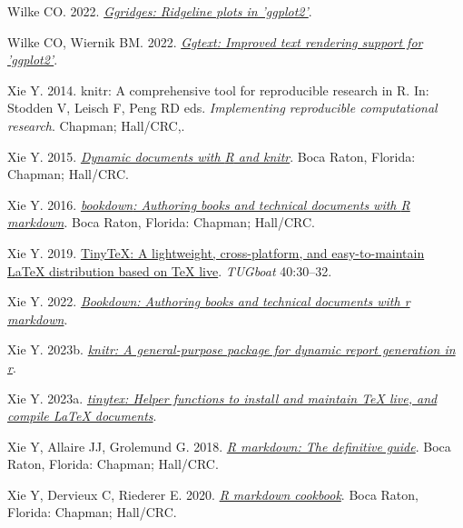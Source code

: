 \documentclass[10pt,a4paper]{article}
\newlength{\cslhangindent}
\newenvironment{CSLReferences}[2] %
 {\begin{list}{}{%
  \setlength{\itemindent}{0pt}
  \setlength{\leftmargin}{0pt}
  \setlength{\parsep}{0pt}
  \ifodd #1
   \setlength{\leftmargin}{\cslhangindent}
   \setlength{\itemindent}{-1\cslhangindent}
  \fi
  \setlength{\itemsep}{#2\baselineskip}}}
 {\end{list}}
\begin{document}
\begin{CSLReferences}{1}{0}
Wilke CO. 2022. \emph{\href{https://CRAN.R-project.org/package=ggridges}{Ggridges: Ridgeline plots in 'ggplot2'}}.

Wilke CO, Wiernik BM. 2022. \emph{\href{https://CRAN.R-project.org/package=ggtext}{Ggtext: Improved text rendering support for 'ggplot2'}}.

Xie Y. 2014. {knitr}: A comprehensive tool for reproducible research in {R}. In: Stodden V, Leisch F, Peng RD eds. \emph{Implementing reproducible computational research}. Chapman; Hall/CRC,.

Xie Y. 2015. \emph{\href{https://yihui.org/knitr/}{Dynamic documents with {R} and knitr}}. Boca Raton, Florida: Chapman; Hall/CRC.

Xie Y. 2016. \emph{\href{https://bookdown.org/yihui/bookdown}{{bookdown}: Authoring books and technical documents with {R} markdown}}. Boca Raton, Florida: Chapman; Hall/CRC.

Xie Y. 2019. \href{https://tug.org/TUGboat/Contents/contents40-1.html}{{TinyTeX}: A lightweight, cross-platform, and easy-to-maintain LaTeX distribution based on TeX live}. \emph{TUGboat} 40:30--32.

Xie Y. 2022. \emph{\href{https://CRAN.R-project.org/package=bookdown}{Bookdown: Authoring books and technical documents with r markdown}}.

Xie Y. 2023b. \emph{\href{https://yihui.org/knitr/}{{knitr}: A general-purpose package for dynamic report generation in r}}.

Xie Y. 2023a. \emph{\href{https://github.com/rstudio/tinytex}{{tinytex}: Helper functions to install and maintain TeX live, and compile LaTeX documents}}.

Xie Y, Allaire JJ, Grolemund G. 2018. \emph{\href{https://bookdown.org/yihui/rmarkdown}{R markdown: The definitive guide}}. Boca Raton, Florida: Chapman; Hall/CRC.

Xie Y, Dervieux C, Riederer E. 2020. \emph{\href{https://bookdown.org/yihui/rmarkdown-cookbook}{R markdown cookbook}}. Boca Raton, Florida: Chapman; Hall/CRC.

\end{CSLReferences}
\end{document}
